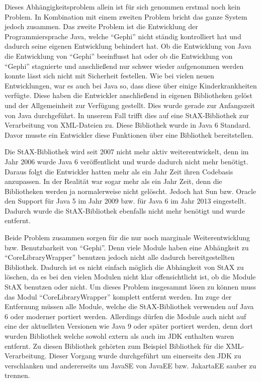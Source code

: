 Dieses Abhängigkeitsproblem allein ist für sich genommen erstmal noch kein
Problem. In Kombination mit einem zweiten Problem bricht das ganze System jedoch
zusammen. Das zweite Problem ist die Entwicklung der Programmiersprache Java,
welche \enquote{Gephi} nicht ständig kontrolliert hat und dadurch seine eigenen
Entwicklung behindert hat. Ob die Entwicklung von Java die Entwicklung von
\enquote{Gephi} beeinflusst hat oder ob die Entwicklung von \enquote{Gephi}
stagnierte und anschließend nur schwer wieder aufgenommen werden konnte lässt
sich nicht mit Sicherheit festellen. Wie bei vielen neuen Entwicklungen, war es
auch bei Java so, dass diese über einige Kinderkrankheiten verfügte. Diese haben
die Entwickler anschließend in eigenen Bibliotheken gelöst und der Allgemeinheit
zur Verfügung gestellt. Dies wurde gerade zur Anfangszeit von Java durchgeführt.
In unserem Fall trifft dies auf eine StAX-Bibliothek zur Verarbeitung von
\gls{XML}-Dateien zu. Diese Bibliothek wurde in Java 6 Standard. Davor musste ein
Entwickler diese Funktionen über eine Bibliothek bereitstellen. 


Die StAX-Bibliothek wird seit 2007 nicht mehr aktiv weiterentwickelt, denn im
Jahr 2006 wurde Java 6 veröffentlicht und wurde dadurch nicht mehr benötigt.
Daraus folgt die Entwickler hatten mehr als ein Jahr Zeit ihren Codebasis
anzupassen. In der Realität war sogar mehr als ein Jahr Zeit, denn die
Bibliotheken werden ja normalerweise nicht gelöscht. Jedoch hat Sun bzw. Oracle
den Support für Java 5 im Jahr 2009 bzw. für Java 6 im Jahr 2013 eingestellt.
Dadurch wurde die StAX-Bibliothek ebenfalls nicht mehr benötigt und wurde
entfernt. 

Beide Problem zusammen sorgen für die nur noch marginale Weiterentwicklung bzw.
Benutzbarkeit von \enquote{Gephi}. Denn viele Module haben eine Abhängkeit zu
\enquote{CoreLibraryWrapper} benutzen jedoch nicht alle dadurch bereitgestellten
Bibliothek. Dadurch ist es nicht einfach möglich die Abhängkeit von StAX zu löschen,
da es bei den vielen Modulen nicht klar offensichtlicht ist, ob die Module StAX
benutzen oder nicht. Um dieses Problem insgesammt lösen zu können muss das Modul
\enquote{CoreLibraryWrapper} komplett entfernt werden. Im zuge der Entfernung
müssen alle Module, welche die StAX-Bibliothek verwenden auf Java 6 oder moderner
portiert werden. Allerdings dürfen die Module auch nicht auf eine der aktuellsten
Versionen wie Java 9 oder später portiert werden, denn dort wurden Bibliothek
welche sowohl extern als auch im JDK enthalten waren entfernt. Zu diesen Bibliothek
gehörten zum Beispiel Bibliothek für die \gls{XML}-Verarbeitung. Dieser Vorgang
wurde durchgeführt um einerseits den JDK zu verschlanken und andererseits um
JavaSE von JavaEE bzw. JakartaEE sauber zu trennen.

